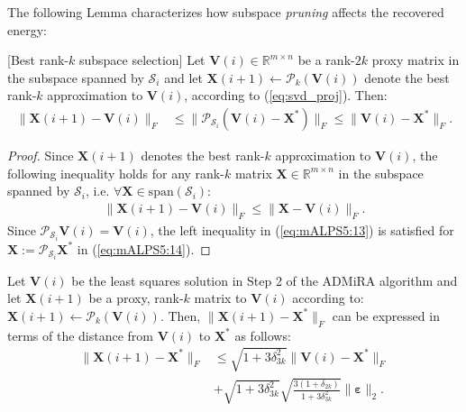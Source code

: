 \documentclass[twocolumn]{svjour3}
\newcommand{\vectornormbig}[1]{\big\|#1\big\|}
\newcommand{\signal}{\boldsymbol{X}}
\newcommand{\bestsignal}{\boldsymbol{X}^\ast}
\newcommand{\noise}{\boldsymbol{\varepsilon}}
\newcommand{\dimension}{m \times n}
\newcommand{\rank}{k}
\begin{document}
The following Lemma characterizes how subspace {\it pruning} affects the recovered energy:

\begin{lemma}{\label{lemma:comb_selection}}[Best rank-$ \rank $ subspace selection] Let $ \boldsymbol{V}(i) \in \mathbb{R}^{\dimension} $ be a rank-$ 2\rank $ proxy matrix in the subspace spanned by $ \mathcal{S}_i $ and let $ \signal(i+1) \leftarrow \mathcal{P}_{\rank}(\boldsymbol{V}(i)) $ denote the best rank-$ \rank $ approximation to $ \boldsymbol{V}(i) $, according to (\ref{eq:svd_proj}). Then:
\begin{align}
\vectornormbig{\signal(i+1)  - \boldsymbol{V}(i)}_F &\leq \vectornormbig{\mathcal{P}_{\mathcal{S}_i}(\boldsymbol{V}(i) - \bestsignal)}_F \leq \vectornormbig{\boldsymbol{V}(i) - \bestsignal}_F. \label{eq:mALPS5:13}
\end{align}
\end{lemma}

\begin{proof}
Since $ \signal(i+1) $ denotes the best rank-$ \rank $ approximation to $ \boldsymbol{V}(i) $, the following inequality holds for any rank-$\rank$ matrix $ \signal \in \mathbb{R}^{\dimension} $ in the subspace spanned by $ \mathcal{S}_i $, i.e. $ \forall \signal \in \text{span}(\mathcal{S}_i) $:
\begin{align}
\vectornormbig{\signal(i+1)  - \boldsymbol{V}(i)}_F \leq \vectornormbig{\signal  - \boldsymbol{V}(i)}_F \label{eq:mALPS5:14}.
\end{align} Since $ \mathcal{P}_{\mathcal{S}_i} \boldsymbol{V}(i) =  \boldsymbol{V}(i) $, the left inequality in (\ref{eq:mALPS5:13}) is satisfied for $ \signal := \mathcal{P}_{\mathcal{S}_i} \bestsignal $ in (\ref{eq:mALPS5:14}). 
\end{proof}

\begin{lemma}{\label{lemma:noname}} Let $ \boldsymbol{V}(i) $ be the least squares solution in Step 2 of the ADMiRA algorithm
and let $ \signal(i+1) $ be a proxy, rank-$ \rank $ matrix to $ \boldsymbol{V}(i) $ according to: $ \signal(i+1) \leftarrow \mathcal{P}_k(\boldsymbol{V}(i)). $ Then, $ \vectornormbig{\signal(i+1)  - \bestsignal}_F $ can be expressed in terms of the distance from $ \boldsymbol{V}(i) $ to $ \bestsignal $ as follows:
\begin{align}
\vectornormbig{\signal(i+1) - \bestsignal}_F &\leq \sqrt{1 + 3\delta_{3\rank}^2} \vectornormbig{\boldsymbol{V}(i) - \bestsignal}_F \nonumber \\ &+ \sqrt{1 + 3\delta_{3\rank}^2} \sqrt{\frac{3(1+\delta_{2\rank})}{1 + 3\delta_{3\rank}^2}}\vectornormbig{\noise}_2. \label{eq:73}
\end{align}
\end{lemma}
\end{document}
